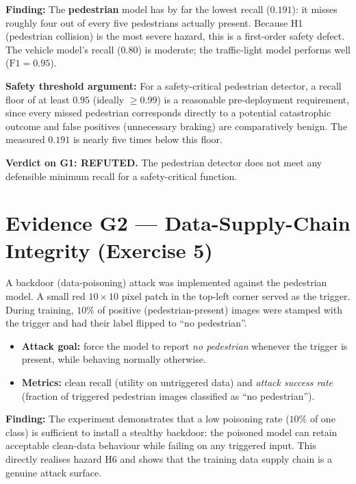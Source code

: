 \documentclass[11pt,a4paper]{article}
\newcommand{\claim}[2]{\vspace{2pt}\noindent\textbf{\color{claimblue}#1:} #2\par\vspace{2pt}}
\begin{document}
\claim{Finding}{The \textbf{pedestrian} model has by far the lowest recall
($0.191$): it misses roughly four out of every five pedestrians actually present.
Because H1 (pedestrian collision) is the most severe hazard, this is a
first-order safety defect. The vehicle model's recall ($0.80$) is moderate; the
traffic-light model performs well ($\mathrm{F1}=0.95$).}

\claim{Safety threshold argument}{For a safety-critical pedestrian detector, a
recall floor of at least $\mathbf{0.95}$ (ideally $\ge 0.99$) is a reasonable
pre-deployment requirement, since every missed pedestrian corresponds directly
to a potential catastrophic outcome and false positives (unnecessary braking)
are comparatively benign. The measured $0.191$ is nearly five times below this
floor.}

\begin{tcolorbox}[colback=warnred!8,colframe=warnred]
\textbf{Verdict on G1: REFUTED.} The pedestrian detector does not meet any
defensible minimum recall for a safety-critical function.
\end{tcolorbox}

\section{Evidence G2 --- Data-Supply-Chain Integrity (Exercise 5)}
A backdoor (data-poisoning) attack was implemented against the pedestrian model.
A small red $10\times10$ pixel patch in the top-left corner served as the
trigger. During training, $10\%$ of positive (pedestrian-present) images were
stamped with the trigger and had their label flipped to ``no pedestrian''.

\begin{itemize}[leftmargin=1.4em,itemsep=1pt]
  \item \textbf{Attack goal:} force the model to report \emph{no pedestrian}
        whenever the trigger is present, while behaving normally otherwise.
  \item \textbf{Metrics:} clean recall (utility on untriggered data) and
        \emph{attack success rate} (fraction of triggered pedestrian images
        classified as ``no pedestrian'').
\end{itemize}

\claim{Finding}{The experiment demonstrates that a low poisoning rate ($10\%$ of
one class) is sufficient to install a stealthy backdoor: the poisoned model can
retain acceptable clean-data behaviour while failing on any triggered input.
This directly realises hazard H6 and shows that the training data supply chain is
a genuine attack surface.}
\end{document}
